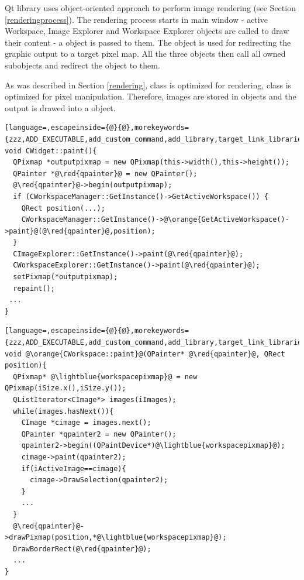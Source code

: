 Qt library uses object-oriented approach to perform image rendering (see Section \ref{renderingprocess}). The rendering process starts in main window - active Workspace, Image Explorer and Workspace Explorer objects are called to draw their content - a  object is passed to them. The  object is used for redirecting the graphic output to a target pixel map. All the three objects then call all owned subobjects and redirect the  object to them.

As was described in Section \ref{rendering},  class is optimized for rendering,  class is optimized for pixel manipulation. Therefore, images are stored in  objects and the output is drawed into a  object.

\begin{lstlisting}[language=,escapeinside={@}{@},morekeywords={zzz,ADD_EXECUTABLE,add_custom_command,add_library,target_link_libraries,OUTPUT,COMMAND,xxx})]
void CWidget::paint(){
  QPixmap *outputpixmap = new QPixmap(this->width(),this->height());
  QPainter *@\red{qpainter}@ = new QPainter();
  @\red{qpainter}@->begin(outputpixmap);
  if (CWorkspaceManager::GetInstance()->GetActiveWorkspace()) {
    QRect position(...);
    CWorkspaceManager::GetInstance()->@\orange{GetActiveWorkspace()->paint}@(@\red{qpainter}@,position);
  }
  CImageExplorer::GetInstance()->paint(@\red{qpainter}@);
  CWorkspaceExplorer::GetInstance()->paint(@\red{qpainter}@);
  setPixmap(*outputpixmap);
  repaint(); 
 ...
}
\end{lstlisting}

\begin{lstlisting}[language=,escapeinside={@}{@},morekeywords={zzz,ADD_EXECUTABLE,add_custom_command,add_library,target_link_libraries,OUTPUT,COMMAND,xxx})]
void @\orange{CWorkspace::paint}@(QPainter* @\red{qpainter}@, QRect position){
  QPixmap* @\lightblue{workspacepixmap}@ = new QPixmap(iSize.x(),iSize.y());
  QListIterator<CImage*> images(iImages);
  while(images.hasNext()){
    CImage *cimage = images.next();
    QPainter *qpainter2 = new QPainter();
    qpainter2->begin((QPaintDevice*)@\lightblue{workspacepixmap}@);
    cimage->paint(qpainter2);
    if(iActiveImage==cimage){
      cimage->DrawSelection(qpainter2);
    }
    ...
  }
  @\red{qpainter}@->drawPixmap(position,*@\lightblue{workspacepixmap}@);
  DrawBorderRect(@\red{qpainter}@);
  ...
}
\end{lstlisting}